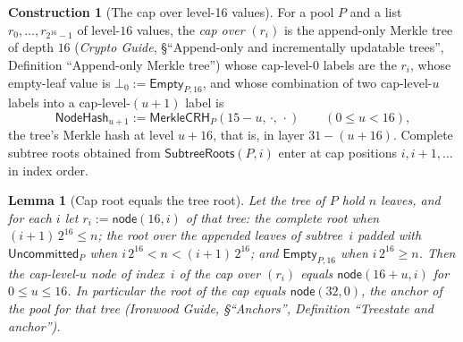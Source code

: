 \documentclass[11pt,a4paper]{article}
\newtheorem{lemma}[theorem]{Lemma}
\theoremstyle{definition}
\newtheorem{construction}[theorem]{Construction}
\begin{document}
\begin{construction}[The cap over level-16 values]\label{def:tree-cap}
For a pool $P$ and a list $r_0, \dots, r_{2^{16}-1}$ of level-$16$ values,
the \emph{cap over} $(r_i)$ is the append-only Merkle tree of depth $16$
(\emph{Crypto Guide}, \S``Append-only and incrementally updatable trees'',
Definition ``Append-only Merkle tree'') whose cap-level-$0$ labels are the
$r_i$, whose empty-leaf value is $\bot_0 := \mathsf{Empty}_{P,16}$, and whose
combination of two cap-level-$u$ labels into a cap-level-$(u+1)$ label is
\[
  \mathsf{NodeHash}_{u+1} := \mathsf{MerkleCRH}_P(15 - u,\, \cdot,\, \cdot)
  \qquad (0 \le u < 16),
\]
the tree's Merkle hash at level $u + 16$, that is, in layer
$31 - (u + 16)$. Complete subtree roots obtained from
$\mathsf{SubtreeRoots}(P, i)$ enter at cap positions $i, i + 1, \dots$ in
index order.
\end{construction}

\begin{lemma}[Cap root equals the tree root]\label{lem:tree-cap}
Let the tree of $P$ hold $n$ leaves, and for each $i$ let
$r_i := \mathsf{node}(16, i)$ of that tree: the complete root when
$(i + 1)\,2^{16} \le n$; the root over the appended leaves of subtree~$i$
padded with $\mathsf{Uncommitted}_P$ when $i\,2^{16} < n < (i + 1)\,2^{16}$;
and $\mathsf{Empty}_{P,16}$ when $i\,2^{16} \ge n$. Then the cap-level-$u$
node of index~$i$ of the cap over $(r_i)$ equals $\mathsf{node}(16 + u, i)$
for $0 \le u \le 16$. In particular the root of the cap equals
$\mathsf{node}(32, 0)$, the anchor of the pool for that tree
(\emph{Ironwood Guide}, \S``Anchors'', Definition ``Treestate and anchor'').
\end{lemma}
\end{document}
